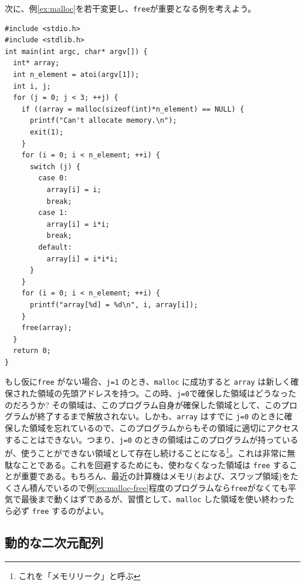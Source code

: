 次に、例\ref{ex:malloc}を若干変更し、\verb|free|が重要となる例を考えよう。
\begin{reidai}\label{ex:malloc-free}
\begin{verbatim}
#include <stdio.h>
#include <stdlib.h>
int main(int argc, char* argv[]) {
  int* array;
  int n_element = atoi(argv[1]);
  int i, j;
  for (j = 0; j < 3; ++j) {
    if ((array = malloc(sizeof(int)*n_element) == NULL) {
      printf("Can't allocate memory.\n");
      exit(1);
    }
    for (i = 0; i < n_element; ++i) {
      switch (j) {
        case 0:
          array[i] = i;
          break;
        case 1:
          array[i] = i*i;
          break;
        default:
          array[i] = i*i*i;
      }
    }
    for (i = 0; i < n_element; ++i) {
      printf("array[%d] = %d\n", i, array[i]);
    }
    free(array);
  }
  return 0;
}
\end{verbatim}
\end{reidai} \noindent
もし仮に\verb|free| がない場合、\verb|j=1| のとき、\verb|malloc| に成功すると \verb|array| は新しく確保された領域の先頭アドレスを持つ。この時、\verb|j=0|で確保した領域はどうなったのだろうか? その領域は、このプログラム自身が確保した領域として、このプログラムが終了するまで解放されない。しかも、\verb|array| はすでに \verb|j=0| のときに確保した領域を忘れているので、このプログラムからもその領域に適切にアクセスすることはできない。つまり、\verb|j=0| のときの領域はこのプログラムが持っているが、使うことができない領域として存在し続けることになる\footnote{これを「メモリリーク」と呼ぶ}。これは非常に無駄なことである。これを回避するためにも、使わなくなった領域は \verb|free| することが重要である。もちろん、最近の計算機はメモリ(および、スワップ領域)をたくさん積んでいるので例\ref{ex:malloc-free}程度のプログラムなら\verb|free|がなくても平気で最後まで動くはずであるが、習慣として、\verb|malloc| した領域を使い終わったら必ず \verb|free| するのがよい。

\subsection{動的な二次元配列}

